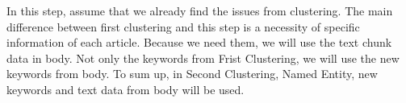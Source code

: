 In this step, assume that we already find the issues from clustering. The main difference between first clustering and this step is a necessity of specific information of each article. Because we need them, we will use the text chunk data in body. Not only the keywords from Frist Clustering, we will use the new keywords from body. To sum up, in Second Clustering, Named Entity, new keywords and text data from body will be used.